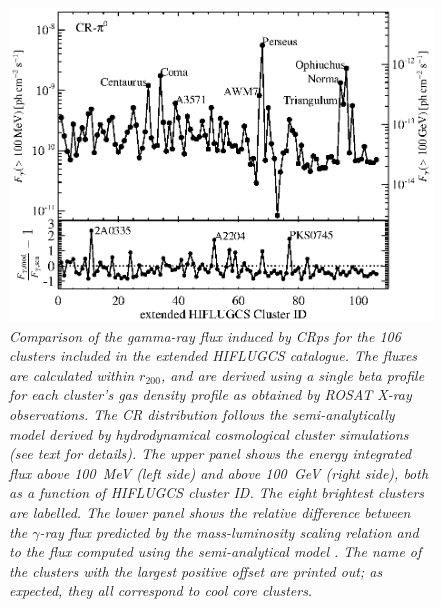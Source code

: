 \documentclass[10pt,aps,pra,reprint,amsmath,amsfonts,amssymb,showpacs]{revtex4-1}
\newcommand{\rvir}{r_{200}}
\begin{document}
\begin{figure}%
\begin{minipage}{2.0\columnwidth}
 \includegraphics[width=0.99\columnwidth]{figures/Flux.comp.CR.eps}
 \caption{\it Comparison of the gamma-ray flux induced by CRps for the 106
   clusters included in the extended HIFLUGCS catalogue. The fluxes are
   calculated within $\rvir$, and are derived using a single beta profile for
   each cluster's gas density profile as obtained by ROSAT X-ray
   observations. The CR distribution follows the semi-analytically model derived
   by hydrodynamical cosmological cluster simulations \cite{2010MNRAS.409..449P}
   (see text for details). The upper panel shows the energy integrated flux
   above 100~MeV (left side) and above 100~GeV (right side), both as a function
   of HIFLUGCS cluster ID. The eight brightest clusters are labelled. The lower
   panel shows the relative difference between the $\gamma$-ray flux predicted by
   the mass-luminosity scaling relation and to the flux computed using the
   semi-analytical model \cite{2010MNRAS.409..449P}. The name of the clusters
   with the largest positive offset are printed out; as expected, they all
   correspond to cool core clusters.}
 \label{fig19}
\end{minipage}
\end{figure}
\end{document}
